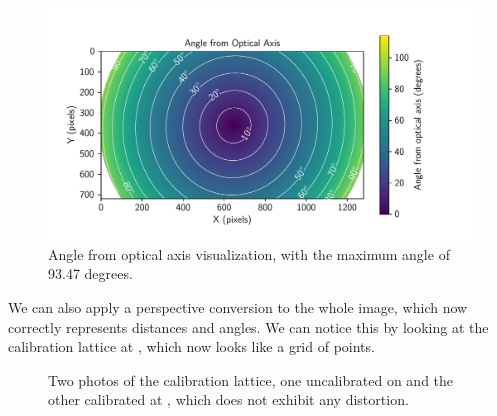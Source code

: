 \begin{figure}[H]
	\centering
	\includegraphics[width=1.0\textwidth]{./fig/pgfplot/build/evk4_viz.pdf}
	\caption{Angle from optical axis visualization, with the maximum angle of 93.47 degrees.}
	\label{fig:calibration_viz}
\end{figure}

We can also apply a perspective conversion to the whole image, which now correctly represents distances and angles. We can notice this by looking
at the calibration lattice at , which now looks like a grid of points.

\begin{figure}[H]
	\centering
	\caption{
		Two photos of the calibration lattice, one uncalibrated on  and the other calibrated at , which does not
		exhibit any distortion.
  }
	\label{fig:calib_c}
\end{figure}


